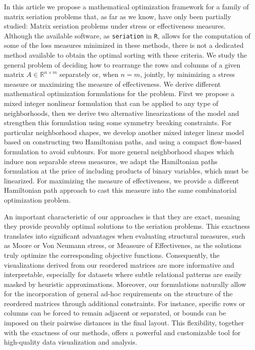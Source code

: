 \documentclass[a4paper,11pt, reqno]{amsart}
\def\R{\mathbb{R}}
\begin{document}
In this article we propose a mathematical optimization framework for a family of matrix seriation problems that, as far as we know, have only been partially studied: Matrix seriation problems under stress or effectiveness measures. Although the available software, as \texttt{seriation} in \texttt{R}, allows for the computation of some of the loss measures minimized in these methods, there is not a dedicated method available to obtain the optimal sorting with these criteria. We study the general problem of deciding how to rearrange the rows and columns of a given matrix $A\in \R^{n\times m}$ separately or, when $n=m$, jointly, by minimizing a stress measure or maximizing the measure of effectiveness. We derive different mathematical optimization formulations for the problem. First we propose a mixed integer nonlinear formulation that can be applied to any type of neighborhoods, then we derive two alternative linearizations of the model and strengthen this formulation using some symmetry breaking constraints. For particular neighborhood shapes, we develop another mixed integer linear model based on constructing two Hamiltonian paths, and using a compact flow-based formulation to avoid subtours. For more general neighborhood shapes which induce non separable stress measures, we adapt the Hamiltonian paths formulation at the price of including products of binary variables, which must be linearized. For maximizing the measure of effectiveness, we provide a different Hamiltonian path approach to cast this measure into the same combinatorial optimization problem. 
 
An important characteristic of our approaches is that they are exact, meaning they provide provably optimal solutions to the seriation problems. This exactness translates into significant advantages when evaluating structural measures, such as Moore or Von Neumann stress, or Meassure of Effectivenes, as the solutions truly optimize the corresponding objective functions. Consequently, the visualizations derived from our reordered matrices are more informative and interpretable, especially for datasets where subtle relational patterns are easily masked by heuristic approximations. Moreover, our formulations naturally allow for the incorporation of general ad-hoc requirements on the structure of the reordered matrices through additional constraints. For instance, specific rows or columns can be forced to remain adjacent or separated, or bounds can be imposed on their pairwise distances in the final layout. This flexibility, together with the exactness of our methods, offers a powerful and customizable tool for high-quality data visualization and analysis.
\end{document}
